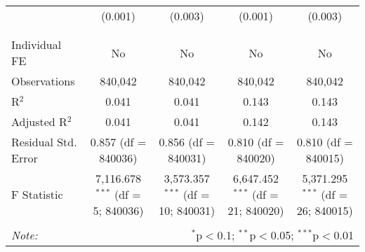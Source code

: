 \documentclass[
]{article}
\begin{document}
\begin{table}[!htbp]
{\begin{tabular}{@{\extracolsep{5pt}}lcccc}
  & (0.001) & (0.003) & (0.001) & (0.003) \\ 
  & & & & \\ 
\hline \\[-1.8ex] 
Individual FE & No & No & No & No \\ 
Observations & 840,042 & 840,042 & 840,042 & 840,042 \\ 
R$^{2}$ & 0.041 & 0.041 & 0.143 & 0.143 \\ 
Adjusted R$^{2}$ & 0.041 & 0.041 & 0.142 & 0.143 \\ 
Residual Std. Error & 0.857 (df = 840036) & 0.856 (df = 840031) & 0.810 (df = 840020) & 0.810 (df = 840015) \\ 
F Statistic & 7,116.678$^{***}$ (df = 5; 840036) & 3,573.357$^{***}$ (df = 10; 840031) & 6,647.452$^{***}$ (df = 21; 840020) & 5,371.295$^{***}$ (df = 26; 840015) \\ 
\hline 
\hline \\[-1.8ex] 
\textit{Note:}  & \multicolumn{4}{r}{$^{*}$p$<$0.1; $^{**}$p$<$0.05; $^{***}$p$<$0.01} \\ 
\end{tabular}
} 
\end{table} 
\newpage
\end{document}
